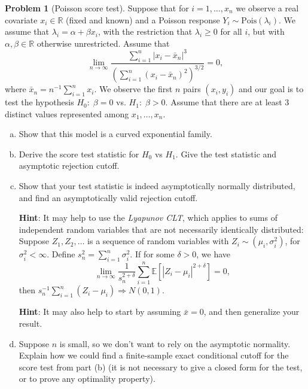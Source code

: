 \documentclass{article}
\newcommand{\EE}{\mathbb{E}}
\newcommand{\RR}{\mathbb{R}}
\theoremstyle{definition}
\newtheorem{problem}{Problem}
\begin{document}
\begin{problem}[Poisson score test]
Suppose that for $i=1,\ldots,x_n$ we observe a real covariate $x_i \in \RR$ (fixed and known) and a Poisson response $Y_i \sim \text{Pois}(\lambda_i)$. We assume that $\lambda_i = \alpha + \beta x_i$, with the restriction that $\lambda_i \geq 0$ for all $i$, but with $\alpha, \beta \in \RR$ otherwise unrestricted. Assume that
\[
\lim_{n \to \infty} \frac{\sum_{i=1}^n |x_i - \bar{x}_n|^3}{\left(\sum_{i=1}^n (x_i-\bar{x}_n)^2\right)^{3/2}} = 0,
\]
where $\bar{x}_n = n^{-1}\sum_{i=1}^n x_i$. We observe the first $n$ pairs $(x_i,y_i)$ and our goal is to test the hypothesis $H_0:\; \beta = 0$ vs. $H_1:\; \beta > 0$. Assume that there are at least 3 distinct values represented among $x_1,\ldots,x_n$.

\begin{enumerate}[(a)]
\item Show that this model is a curved exponential family.



\item Derive the score test statistic for $H_0$ vs $H_1$. Give the test statistic and asymptotic rejection cutoff.




\item Show that your test statistic is indeed asymptotically normally distributed, and find an asymptotically valid rejection cutoff.

{\bf Hint}: It may help to use the {\em Lyapunov CLT}, which applies to sums of independent random variables that are  not necessarily identically distributed: Suppose $Z_1,Z_2,\ldots$ is a sequence of random variables with $Z_i \sim (\mu_i, \sigma_i^2)$, for $\sigma_i^2 < \infty$. Define $s_n^2 = \sum_{i=1}^n \sigma_i^2$. If for some $\delta > 0$, we have
\[
\lim_{n \to \infty} \frac{1}{s_n^{2+\delta}} \sum_{i=1}^n \EE\left[|Z_i - \mu_i|^{2+\delta}\right] = 0,
\]
then $s_n^{-1}\sum_{i=1}^n (Z_i - \mu_i) \Rightarrow N(0,1)$.

{\bf Hint}: It may also help to start by assuming $\bar{x} = 0$, and then generalize your result.




\item Suppose $n$ is small, so we don't want to rely on the asymptotic normality. Explain how we could find a finite-sample exact conditional cutoff for the score test from part (b) (it is not necessary to give a closed form for the test, or to prove any optimality property).


\end{enumerate}
\end{problem}
\end{document}

